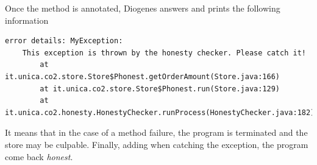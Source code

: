 Once the method is annotated,
Diogenes answers  and prints the following information
\begin{mdframed}
\begin{verbatim}
error details: MyException: 
    This exception is thrown by the honesty checker. Please catch it!
        at it.unica.co2.store.Store$Phonest.getOrderAmount(Store.java:166)
        at it.unica.co2.store.Store$Phonest.run(Store.java:129)
        at it.unica.co2.honesty.HonestyChecker.runProcess(HonestyChecker.java:182)
\end{verbatim}
\end{mdframed}
It means that in the case of a method failure,
the program is terminated and the store may be culpable.
Finally, adding  when catching the exception,
the program come back \emph{honest}.






